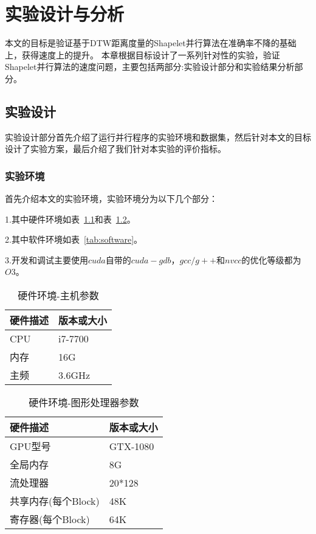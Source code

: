 \chapter{实验设计与分析}
\label{cha:expriment}

本文的目标是验证基于DTW距离度量的Shapelet并行算法在准确率不降的基础上，获得速度上的提升。
本章根据目标设计了一系列针对性的实验，验证Shapelet并行算法的速度问题，主要包括两部分:实验设计部分和实验结果分析部分。

\section{实验设计}

实验设计部分首先介绍了运行并行程序的实验环境和数据集，然后针对本文的目标设计了实验方案，最后介绍了我们针对本实验的评价指标。
\subsection{实验环境}
首先介绍本文的实验环境，实验环境分为以下几个部分：

1.其中硬件环境如表~\ref{tab:computerversion}和表~\ref{tab:gpuversion}。

2.其中软件环境如表~\ref{tab:software}。

3.开发和调试主要使用$cuda$自带的$cuda-gdb$，$gcc/g++$和$nvcc$的优化等级都为$O3$。

\begin{table}[htb]
	\centering
	\begin{minipage}{0.5\textwidth}
		\centering
		\caption{硬件环境-主机参数}
		\label{tab:computerversion}
		\begin{tabular}{p{4cm}p{2cm}}
			\toprule[1.5pt]
			硬件描述 & 版本或大小 \\
			\midrule[1pt]
			CPU & i7-7700 \\
			内存 & 16G  \\
			主频 & 3.6GHz  \\
			\bottomrule[1.5pt]
		\end{tabular}
	\end{minipage}%
\end{table}

\begin{table}[htb]
	\centering
	\begin{minipage}{0.5\textwidth}
	\centering
	\caption{硬件环境-图形处理器参数}
	\label{tab:gpuversion}
		\begin{tabular}{p{4cm}p{2cm}}
			\toprule[1.5pt]
			硬件描述 & 版本或大小 \\
			\midrule[1pt]
			GPU型号 & GTX-1080 \\
			全局内存 & 8G \\
			流处理器 & 20*128 \\
			共享内存(每个Block) & 48K \\
			寄存器(每个Block) & 64K \\
			\bottomrule[1.5pt]
		\end{tabular}
	\end{minipage}
\end{table}

